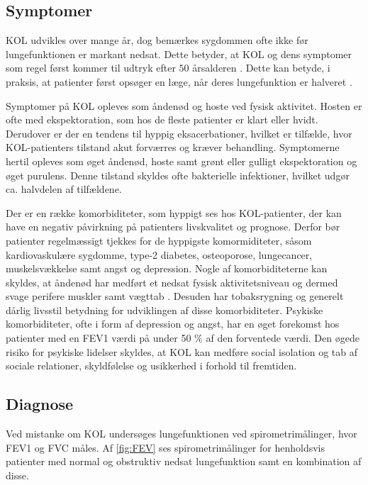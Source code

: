 \subsection{Symptomer}
KOL udvikles over mange år, dog bemærkes sygdommen ofte ikke før lungefunktionen er markant nedsat. Dette betyder, at KOL og dens symptomer som regel først kommer til udtryk efter $50$ årsalderen \cite{Lange2015}. Dette kan betyde, i praksis, at patienter først opsøger en læge, når deres lungefunktion er halveret \cite{dsam2016}.

Symptomer på KOL opleves som åndenød og hoste ved fysisk aktivitet. Hosten er ofte med ekspektoration, som hos de fleste patienter er klart eller hvidt.\cite{Basisbogen2016} Derudover er der en tendens til hyppig eksacerbationer, hvilket er tilfælde, hvor KOL-patienters tilstand akut forværres og kræver behandling. Symptomerne hertil opleves som øget åndenød, hoste samt grønt eller gulligt ekspektoration og øget purulens. Denne tilstand skyldes ofte bakterielle infektioner, hvilket udgør ca. halvdelen af tilfældene.\cite{dsam2016,Basisbogen2016} 

Der er en række komorbiditeter, som hyppigt ses hos KOL-patienter, der kan have en negativ påvirkning på patienters livskvalitet og prognose. Derfor bør patienter regelmæssigt tjekkes for de hyppigste komormiditeter, såsom kardiovaskulære sygdomme, type-2 diabetes, osteoporose, lungecancer, muskelsvækkelse samt angst og depression.
Nogle af komorbiditeterne kan skyldes, at åndenød har medført et nedsat fysisk aktivitetsniveau og dermed svage perifere muskler samt vægttab \cite{dsam2016}. Desuden har tobaksrygning og generelt dårlig livsstil betydning for udviklingen af disse komorbiditeter.\cite{dsam2016, McCarthy2015}
Psykiske komorbiditeter, ofte i form af depression og angst, har en øget forekomst hos patienter med en FEV1 værdi på under 50 \% af den forventede værdi. Den øgede risiko for psykiske lidelser skyldes, at KOL kan medføre social isolation og tab af sociale relationer, skyldfølelse og usikkerhed i forhold til fremtiden.\cite{dsam2016}


\subsection{Diagnose}
Ved mistanke om KOL undersøges lungefunktionen ved spirometrimålinger, hvor FEV1 og FVC måles. Af \autoref{fig:FEV} ses spirometrimålinger for henholdsvis patienter med normal og obstruktiv nedsat lungefunktion samt en kombination af disse.\cite{Basisbogen2016, Sundhed2013}

